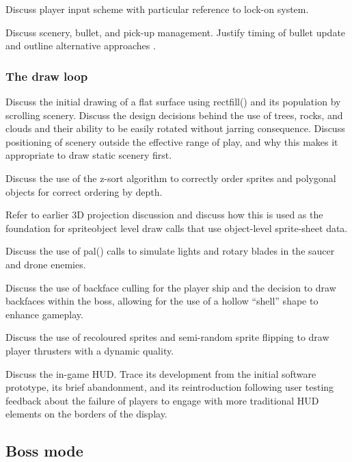 \documentclass{article}
\begin{document}
Discuss player input scheme with particular reference to lock-on system.

Discuss scenery, bullet, and pick-up management. Justify timing of bullet update and outline alternative
approaches \cite{nystrom}.
\subsubsection*{The draw loop}
Discuss the initial drawing of a flat surface using rectfill() and its population by scrolling scenery.
Discuss the design decisions behind the use of trees, rocks, and clouds and their ability to be easily
rotated without jarring consequence. Discuss positioning of scenery outside the effective range of
play, and why this makes it appropriate to draw static scenery first.

Discuss the use of the z-sort algorithm to correctly order sprites and polygonal objects
for correct ordering by depth. 

Refer to earlier 3D projection discussion and discuss how this is used as the foundation for
spriteobject level draw calls that use object-level sprite-sheet data.

Discuss the use of pal() calls to simulate lights and rotary blades in the saucer and drone
enemies.

Discuss the use of backface culling for the player ship and the decision to draw backfaces
within the boss, allowing for the use of a hollow ``shell'' shape to enhance gameplay.

Discuss the use of recoloured sprites and semi-random sprite flipping to draw player thrusters
with a dynamic quality.

Discuss the in-game HUD. Trace its development from the initial software prototype, its brief
abandonment, and its reintroduction following user testing feedback about the failure of players
to engage with more traditional HUD elements on the borders of the display.

\subsection{Boss mode}
\end{document}
